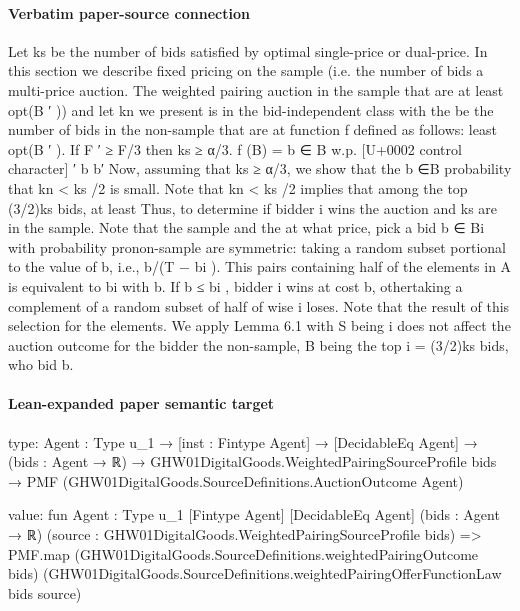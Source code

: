 \documentclass[10pt]{article}
\begin{document}
\paragraph{Verbatim paper-source connection}
\begin{ReviewVerbatim}
Let ks be the number of bids satisfied by optimal single-price or dual-price. In this section we describe
fixed pricing on the sample (i.e. the number of bids a multi-price auction. The weighted pairing auction
in the sample that are at least opt(B ′ )) and let kn we present is in the bid-independent class with the
be the number of bids in the non-sample that are at function f defined as follows:
least opt(B ′ ). If F ′ ≥ F/3 then ks ≥ α/3.
f (B) = b ∈ B w.p. [U+0002 control character] ′ b b′
Now, assuming that ks ≥ α/3, we show that the
b ∈B
probability that kn < ks /2 is small. Note that kn <
ks /2 implies that among the top (3/2)ks bids, at least Thus, to determine if bidder i wins the auction and
ks are in the sample. Note that the sample and the at what price, pick a bid b ∈ Bi with probability pronon-sample are symmetric: taking a random subset portional to the value of b, i.e., b/(T − bi ). This pairs
containing half of the elements in A is equivalent to bi with b. If b ≤ bi , bidder i wins at cost b, othertaking a complement of a random subset of half of wise i loses. Note that the result of this selection for
the elements. We apply Lemma 6.1 with S being i does not affect the auction outcome for the bidder
the non-sample, B being the top i = (3/2)ks bids, who bid b.
\end{ReviewVerbatim}



\paragraph{Lean-expanded paper semantic target}
\begin{ReviewVerbatim}
type:
{Agent : Type u_1} →
  [inst : Fintype Agent] →
    [DecidableEq Agent] →
      (bids : Agent → ℝ) →
        GHW01DigitalGoods.WeightedPairingSourceProfile bids →
          PMF (GHW01DigitalGoods.SourceDefinitions.AuctionOutcome Agent)

value:
fun {Agent : Type u_1} [Fintype Agent] [DecidableEq Agent] (bids : Agent → ℝ)
    (source : GHW01DigitalGoods.WeightedPairingSourceProfile bids) =>
  PMF.map (GHW01DigitalGoods.SourceDefinitions.weightedPairingOutcome bids)
    (GHW01DigitalGoods.SourceDefinitions.weightedPairingOfferFunctionLaw bids source)
\end{ReviewVerbatim}
\end{document}
